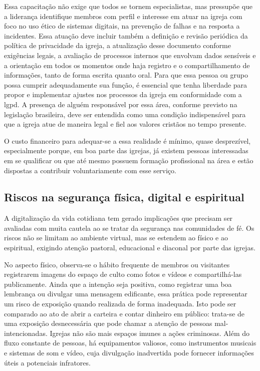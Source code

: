 Essa capacitação não exige que todos se tornem especialistas, mas pressupõe que a liderança identifique membros com perfil e interesse em atuar na igreja com foco no uso ético de sistemas digitais, na prevenção de falhas e na resposta a incidentes. Essa atuação deve incluir também a definição e revisão periódica da política de privacidade da igreja, a atualização desse documento conforme exigências legais, a avaliação de processos internos que envolvam dados sensíveis e a orientação em todos os momentos onde haja registro e o compartilhamento de informações, tanto de forma escrita quanto oral. Para que essa pessoa ou grupo possa cumprir adequadamente sua função, é essencial que tenha liberdade para propor e implementar ajustes nos processos da igreja em conformidade com a \gls{lgpd}. A presença de alguém responsável por essa área, conforme previsto na legislação brasileira, deve ser entendida como uma condição indispensável para que a igreja atue de maneira legal e fiel aos valores cristãos no tempo presente.

O custo financeiro para adequar-se a essa realidade é mínimo, quase desprezível, especialmente porque, em boa parte das igrejas, já existem pessoas interessadas em se qualificar ou que até mesmo possuem formação profissional na área e estão dispostas a contribuir voluntariamente com esse serviço.

\subsection{Riscos na segurança física, digital e espiritual}

A digitalização da vida cotidiana tem gerado implicações que precisam ser avaliadas com muita cautela ao se tratar da segurança nas comunidades de fé. Os riscos não se limitam ao ambiente virtual, mas se estendem ao físico e ao espiritual, exigindo atenção pastoral, educacional e diaconal por parte das igrejas.

No aspecto físico, observa-se o hábito frequente de membros ou visitantes registrarem imagens do espaço de culto como fotos e vídeos e compartilhá-las publicamente. Ainda que a intenção seja positiva, como registrar uma boa lembrança ou divulgar uma mensagem edificante, essa prática pode representar um risco de exposição quando realizada de forma inadequada. Isto pode ser comparado ao ato de abrir a carteira e contar dinheiro em público: trata-se de uma exposição desnecessária que pode chamar a atenção de pessoas mal-intencionadas. Igrejas não são mais espaços imunes a ações criminosas. Além do fluxo constante de pessoas, há equipamentos valiosos, como instrumentos musicais e sistemas de som e vídeo, cuja divulgação inadvertida pode fornecer informações úteis a potenciais infratores.

